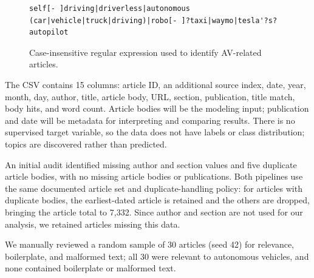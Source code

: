 \documentclass[conference]{IEEEtran}
\begin{document}
\begin{figure}[H]
\centering
\begin{lstlisting}
self[- ]driving|driverless|autonomous (car|vehicle|truck|driving)|robo[- ]?taxi|waymo|tesla'?s? autopilot
\end{lstlisting}
\caption{Case-insensitive regular expression used to identify AV-related articles.}
\label{fig:regex}
\end{figure}

The CSV contains 15 columns: article ID, an additional source index, date, year, month, day, author, title, article body, URL, section, publication, title match, body hits, and word count. Article bodies will be the modeling input; publication and date will be metadata for interpreting and comparing results. There is no supervised target variable, so the data does not have labels or class distribution; topics are discovered rather than predicted.

An initial audit identified missing author and section values and five duplicate article bodies, with no missing article bodies or publications. Both pipelines use the same documented article set and duplicate-handling policy: for articles with duplicate bodies, the earliest-dated article is retained and the others are dropped, bringing the article total to 7,332. Since author and section are not used for our analysis, we retained articles missing this data.

We manually reviewed a random sample of 30 articles (seed 42) for relevance, boilerplate, and malformed text; all 30 were relevant to autonomous vehicles, and none contained boilerplate or malformed text.
\end{document}

